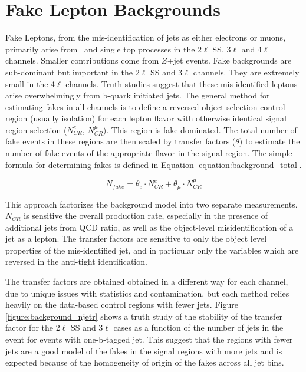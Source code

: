 \section{Fake Lepton Backgrounds}
\label{section:fakes}
Fake Leptons, from the mis-identification of jets as either electrons or muons, primarily arise from \ttbar\ and single top processes in the 2$\ell$ SS, 3$\ell$ and 4$\ell$ channels. Smaller contributions come from $Z$+jet events. Fake backgrounds are sub-dominant but important in the 2$\ell$ SS and 3$\ell$ channels. They are extremely small in the 4$\ell$ channels. Truth studies suggest that these mis-identified leptons arise overwhelmingly from b-quark initiated jets. The general method for estimating fakes in all channels is to define a reversed object selection control region (usually isolation) for each lepton flavor with otherwise identical signal region selection ($N^e_{CR}$, $N^{\mu}_{CR}$). This region is fake-dominated. The total number of fake events in these regions are then scaled by transfer factors ($\theta$) to estimate the number of fake events of the appropriate flavor in the signal region. The simple formula for determining fakes is defined in Equation \ref{equation:background_total}.    


\begin{equation}
N_{fake} = \theta_e \cdot N^e_{CR} + \theta_{\mu} \cdot N^{\mu}_{CR}   
\label{equation:background_total}
\end{equation}

This approach factorizes the background model into two separate measurements. $N_{CR}$ is sensitive the overall \ttbar production rate, especially in the presence of additional jets from QCD ratio, as well as the object-level misidentification of a jet as a lepton. The transfer factors are sensitive to only the object level properties of the mis-identified jet, and in particular only the variables which are reversed in the anti-tight identification. 

The transfer factors are obtained obtained in a different way for each channel, due to unique issues with statistics and contamination, but each method relies heavily on the data-based control regions with fewer jets. Figure \ref{figure:background_njetr} shows a truth study of the stability of the transfer factor for the 2$\ell$ SS and 3$\ell$ cases as a function of the number of jets in the event for events with one-b-tagged jet. This suggest that the regions with fewer jets are a good model of the fakes in the signal regions with more jets and is expected because of the homogeneity of origin of the fakes across all jet bins.  

